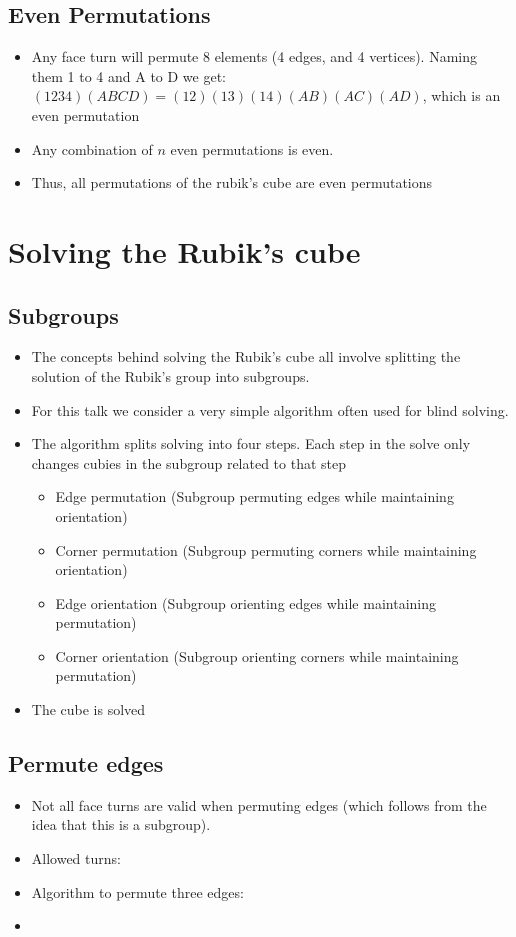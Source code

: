 \documentclass[xcolor=pdftex,dvipsnames,table]{beamer}
\begin{document}
\subsection{Even Permutations}
\begin{frame}
  \begin{itemize}
    \item Any face turn will permute 8 elements (4 edges, and 4 vertices). Naming them 1 to 4 and A to D we get: $(1234)(ABCD) = (12)(13)(14)(AB)(AC)(AD)$, which is an even permutation
    \item Any combination of $n$ even permutations is even.
    \item Thus, all permutations of the rubik's cube are even permutations
  \end{itemize}
\end{frame}

\section{Solving the Rubik's cube}

\subsection{Subgroups}
\begin{frame}
  \begin{itemize}
    \item The concepts behind solving the Rubik's cube all involve splitting the solution of the Rubik's group into subgroups.
    \item For this talk we consider a very simple algorithm often used for blind solving.
    \item The algorithm splits solving into four steps. Each step in the solve only changes cubies in the subgroup related to that step
      \begin{itemize}
      \item Edge permutation (Subgroup permuting edges while maintaining orientation)
      \item Corner permutation (Subgroup permuting corners while maintaining orientation)
      \item Edge orientation (Subgroup orienting edges while maintaining permutation)
      \item Corner orientation (Subgroup orienting corners while maintaining permutation)
      \end{itemize}
    \item The cube is solved
  \end{itemize}
\end{frame}

\subsection{Permute edges}
\begin{frame}
  \begin{itemize}
  \item Not all face turns are valid when permuting edges (which follows from the idea that this is a subgroup).
  \item Allowed turns: 
  \item Algorithm to permute three edges:
  \item
  \end{itemize}
\end{frame}
\end{document}
